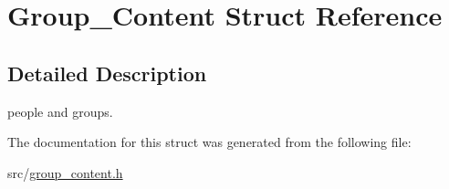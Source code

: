 \hypertarget{structGroup__Content}{
\section{Group\_\-Content Struct Reference}
\label{d2/d04/structGroup__Content}
}


\subsection{Detailed Description}
people and groups. 

The documentation for this struct was generated from the following file:\begin{DoxyCompactItemize}
\item 
src/\hyperlink{group__content_8h}{group\_\-content.h}\end{DoxyCompactItemize}
